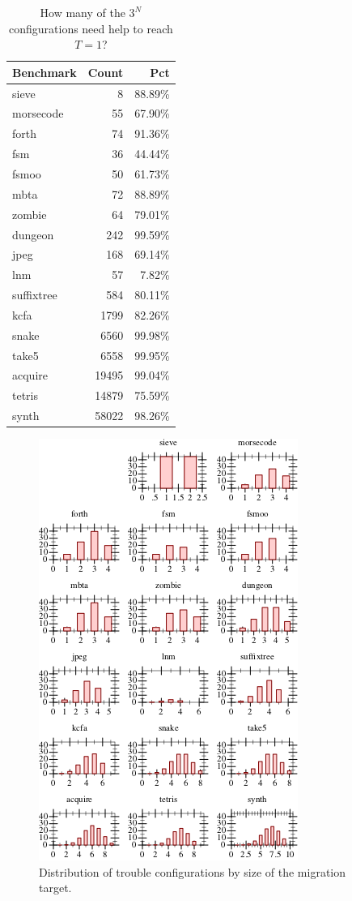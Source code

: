 \documentclass[acmsmall,review,anonymous]{acmart}
\begin{document}
\begin{table}[t]
  \caption{How many of the $3^N$ configurations need help to reach $T=1$?}
  \label{t:baseline-trouble}
  \begin{tabular}{lrr}
    Benchmark  & Count & Pct \\\midrule
    sieve      & 8     & 88.89\% \\
    morsecode  & 55    & 67.90\% \\
    forth      & 74    & 91.36\% \\
    fsm        & 36    & 44.44\% \\
    fsmoo      & 50    & 61.73\% \\
    mbta       & 72    & 88.89\% \\
    zombie     & 64    & 79.01\% \\
    dungeon    & 242   & 99.59\% \\
    jpeg       & 168   & 69.14\% \\
    lnm        & 57    &  7.82\% \\
    suffixtree & 584   & 80.11\% \\
    kcfa       & 1799  & 82.26\% \\
    snake      & 6560  & 99.98\% \\
    take5      & 6558  & 99.95\% \\
    acquire    & 19495 & 99.04\% \\
    tetris     & 14879 & 75.59\% \\
    synth      & 58022 & 98.26\% \\
  \end{tabular}

\end{table}

\begin{figure}[t]
  \caption{Distribution of trouble configurations by size of the migration target.}
  \label{f:where-trouble}
  \includegraphics{data/where-trouble.pdf}
\end{figure}
\end{document}
